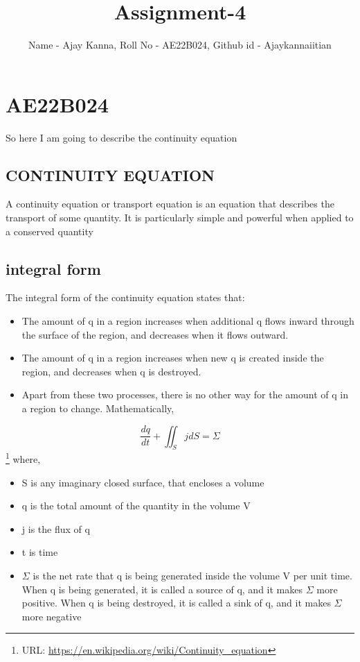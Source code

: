 \documentclass{article}
\title{Assignment-4}
\author{Name - Ajay Kanna, Roll No - AE22B024, Github id - Ajaykannaiitian}
\begin{document}
\maketitle
\section{AE22B024}
So here I am going to describe the continuity equation
\subsection{CONTINUITY EQUATION}
A continuity equation or transport equation is an equation that describes the transport of some quantity. It is particularly simple and powerful when applied to a conserved quantity
\subsection{integral form}
The integral form of the continuity equation states that:
\begin{itemize}
  \item The amount of q in a region increases when additional q flows inward through the surface of the region, and decreases when it flows outward.
  \item The amount of q in a region increases when new q is created inside the region, and decreases when q is destroyed.
  \item Apart from these two processes, there is no other way for the amount of q in a region to change.
Mathematically,
\end{itemize}
\begin{equation}
    \frac{dq}{dt} + \iint_S jdS = \Sigma
\end{equation}
\footnote{URL: \url{https://en.wikipedia.org/wiki/Continuity_equation}}
where,
\begin{itemize}
    \item S is any imaginary closed surface, that encloses a volume 
    \item q is the total amount of the quantity in the volume V
    \item j is the flux of q
    \item t is time
    \item $\Sigma$  is the net rate that q is being generated inside the volume V per unit time. When q is being generated, it is called a source of q, and it makes $\Sigma$ more positive. When q is being destroyed, it is called a sink of q, and it makes $\Sigma$ more negative
\end{itemize}
\end{document}
